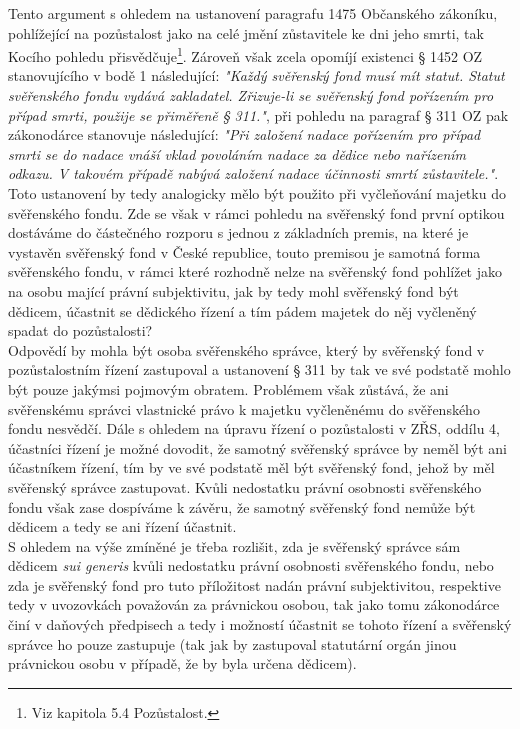 \documentclass{article}
\begin{document}
 Tento argument s ohledem na ustanovení paragrafu 1475 Občanského zákoníku, pohlížející na pozůstalost jako na celé jmění zůstavitele ke dni jeho smrti, tak Kocího pohledu přisvědčuje\footnote{Viz kapitola 5.4 Pozůstalost.}. Zároveň však zcela opomíjí existenci § 1452 OZ stanovujícího v bodě 1 následující: \textit{"Každý svěřenský fond musí mít statut. Statut svěřenského fondu vydává zakladatel. Zřizuje-li se svěřenský fond pořízením pro případ smrti, použije se přiměřeně § 311."}, při pohledu na paragraf § 311 OZ pak zákonodárce stanovuje následující: \textit{"Při založení nadace pořízením pro případ smrti se do nadace vnáší vklad povoláním nadace za dědice nebo nařízením odkazu. V takovém případě nabývá založení nadace účinnosti smrtí zůstavitele."}. Toto ustanovení by tedy analogicky mělo být použito při vyčleňování majetku do svěřenského fondu. Zde se však v rámci pohledu na svěřenský fond první optikou dostáváme do částečného rozporu s jednou z základních premis, na které je vystavěn svěřenský fond v České republice, touto premisou je samotná forma svěřenského fondu, v rámci které rozhodně nelze na svěřenský fond pohlížet jako na osobu mající právní subjektivitu, jak by tedy mohl svěřenský fond být dědicem, účastnit se dědického řízení a tím pádem majetek do něj vyčleněný spadat do pozůstalosti? \\
 
 Odpovědí by mohla být osoba svěřenského správce, který by svěřenský fond v pozůstalostním řízení zastupoval a ustanovení § 311 by tak ve své podstatě mohlo být pouze jakýmsi pojmovým obratem. Problémem však zůstává, že ani svěřenskému správci vlastnické právo k majetku vyčleněnému do svěřenského fondu nesvědčí. Dále s ohledem na úpravu řízení o pozůstalosti v ZŘS, oddílu 4, účastníci řízení je možné dovodit, že samotný svěřenský správce by neměl být ani účastníkem řízení, tím by ve své podstatě měl být svěřenský fond, jehož by měl svěřenský správce zastupovat. Kvůli nedostatku právní osobnosti svěřenského fondu však zase dospíváme k závěru, že samotný svěřenský fond nemůže být dědicem a tedy se ani řízení účastnit.\\
 
 S ohledem na výše zmíněné je třeba rozlišit, zda je svěřenský správce sám dědicem \textit{sui generis} kvůli nedostatku právní osobnosti svěřenského fondu, nebo zda je svěřenský fond pro tuto příložitost nadán právní subjektivitou, respektive tedy v uvozovkách považován za právnickou osobou, tak jako tomu zákonodárce činí  v daňových předpisech a tedy i možností účastnit se tohoto řízení a svěřenský správce ho pouze zastupuje (tak jak by zastupoval statutární orgán jinou právnickou osobu v případě, že by byla určena dědicem).\\
 
\end{document}
